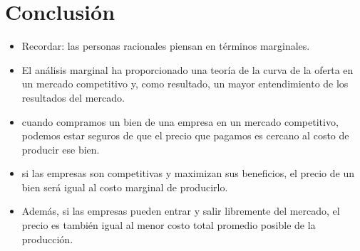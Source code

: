 \documentclass{article}
\begin{document}
\section{Conclusión}
\begin{itemize}
    \item Recordar:  las personas racionales piensan en términos marginales.
    \item  El análisis marginal ha proporcionado una teoría de la curva de la oferta en un mercado competitivo y, como resultado, un mayor entendimiento de los resultados del mercado.
    \item cuando compramos un bien de una empresa en un mercado competitivo, podemos estar seguros de que el precio que pagamos es cercano al costo de producir ese bien.
    \item  si las empresas son competitivas y maximizan sus beneficios, el precio de un bien será igual al costo marginal de producirlo. 
    \item Además, si las empresas pueden entrar y salir libremente del mercado, el precio es también igual al menor costo total promedio posible de la producción. 
\end{itemize}
\end{document}
